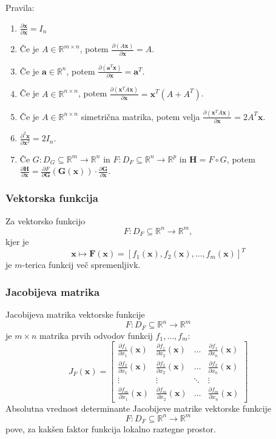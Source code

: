 \documentclass{article}
\begin{document}
\begin{multicols}{2}
Pravila: 
\begin{enumerate}
\item \(\frac{\partial \mathbf{x}}{\partial \mathbf{x}} = I_n\)
\item Če je \(A \in \mathbb{R}^{m \times n}\), potem \(\frac{\partial (A\mathbf{x})}{\partial \mathbf{x}} = A\).
\item Če je \(\mathbf{a} \in \mathbb{R}^n\), potem \(\frac{\partial (\mathbf{a}^T \mathbf{x})}{\partial \mathbf{x}} = \mathbf{a}^T\).
\item Če je \(A \in \mathbb{R}^{n \times n}\), potem \(\frac{\partial (\mathbf{x}^T A \mathbf{x})}{\partial \mathbf{x}} = \mathbf{x}^T(A + A^T)\).
\item Če je \(A \in \mathbb{R}^{n \times n}\) simetrična matrika, potem velja \(\frac{\partial (\mathbf{x}^T A \mathbf{x})}{\partial \mathbf{x}} = 2A^T\mathbf{x}\).
\item \(\frac{\partial^2 \mathbf{x}}{\partial \mathbf{x}^2} = 2I_n\).
\item Če \(G: D_G \subseteq \mathbb{R}^m \rightarrow \mathbb{R}^n\) in \(F: D_F \subseteq \mathbb{R}^n \rightarrow \mathbb{R}^p\) in \( \mathbf{H} = F \circ G\), potem \(\frac{\partial \mathbf{H}}{\partial \mathbf{x}} = \frac{\partial F}{\partial \mathbf{G}}(\mathbf{G}(\mathbf{x})) \cdot \frac{\partial \mathbf{G}}{\partial \mathbf{x}}\).
\end{enumerate}


\subsubsection{Vektorska funkcija}
Za vektorsko funkcijo 
\[ F: D_F \subseteq \mathbb{R}^n \rightarrow \mathbb{R}^m, \]
kjer je
\[ \mathbf{x} \mapsto \mathbf{F}(\mathbf{x}) = [f_1(\mathbf{x}), f_2(\mathbf{x}), \ldots, f_m(\mathbf{x})]^T \]
je \( m \)-terica funkcij več spremenljivk.

\subsubsection{Jacobijeva matrika}
Jacobijeva matrika vektorske funkcije 
\[ F: D_F \subseteq \mathbb{R}^n \rightarrow \mathbb{R}^m \]
je \( m \times n \) matrika prvih odvodov funkcij \( f_1, \ldots, f_m \):
\[ 
J_F(\mathbf{x}) = \begin{bmatrix}
\frac{\partial f_1}{\partial x_1}(\mathbf{x}) & \frac{\partial f_1}{\partial x_2}(\mathbf{x}) & \ldots & \frac{\partial f_1}{\partial x_n}(\mathbf{x}) \\
\frac{\partial f_2}{\partial x_1}(\mathbf{x}) & \frac{\partial f_2}{\partial x_2}(\mathbf{x}) & \ldots & \frac{\partial f_2}{\partial x_n}(\mathbf{x}) \\
\vdots & \vdots & \ddots & \vdots \\
\frac{\partial f_m}{\partial x_1}(\mathbf{x}) & \frac{\partial f_m}{\partial x_2}(\mathbf{x}) & \ldots & \frac{\partial f_m}{\partial x_n}(\mathbf{x})
\end{bmatrix}
\]
Absolutna vrednost determinante Jacobijeve matrike vektorske funkcije 
\[ F: D_F \subseteq \mathbb{R}^n \rightarrow \mathbb{R}^m \]
pove, za kakšen faktor funkcija lokalno raztegne prostor.


\end{multicols}
\end{document}
